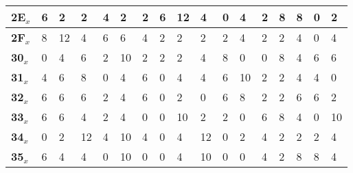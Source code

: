 \begin{longtable}[c]{|l|l|l|l|l|l|l|l|l|l|l|l|l|l|l|l|l|}
\textbf{2E$_x$} & 6              & 2              & 2              & 4              & 2              & 2              & 6              & 12             & 4              & 0              & 4              & 2              & 8              & 8              & 0              & 2              \\ \hline
\textbf{2F$_x$} & 8              & 12             & 4              & 6              & 6              & 4              & 2              & 2              & 2              & 2              & 4              & 2              & 2              & 4              & 0              & 4              \\ \hline
\textbf{30$_x$} & 0              & 4              & 6              & 2              & 10             & 2              & 2              & 2              & 4              & 8              & 0              & 0              & 8              & 4              & 6              & 6              \\ \hline
\textbf{31$_x$} & 4              & 6              & 8              & 0              & 4              & 6              & 0              & 4              & 4              & 6              & 10             & 2              & 2              & 4              & 4              & 0              \\ \hline
\textbf{32$_x$} & 6              & 6              & 6              & 2              & 4              & 6              & 0              & 2              & 0              & 6              & 8              & 2              & 2              & 6              & 6              & 2              \\ \hline
\textbf{33$_x$} & 6              & 6              & 4              & 2              & 4              & 0              & 0              & 10             & 2              & 2              & 0              & 6              & 8              & 4              & 0              & 10             \\ \hline
\textbf{34$_x$} & 0              & 2              & 12             & 4              & 10             & 4              & 0              & 4              & 12             & 0              & 2              & 4              & 2              & 2              & 2              & 4              \\ \hline
\textbf{35$_x$} & 6              & 4              & 4              & 0              & 10             & 0              & 0              & 4              & 10             & 0              & 0              & 4              & 2              & 8              & 8              & 4              \\ \hline

\end{longtable}
